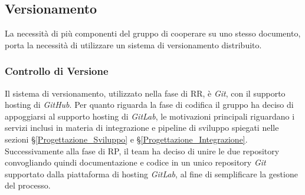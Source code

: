 

\subsection{Versionamento}\label{ProcessiSupporto_Versionamento}
La necessità di più componenti del gruppo di cooperare su uno stesso documento, porta la necessità di utilizzare un sistema di versionamento distribuito. 



\subsubsection{Controllo di Versione}\label{ControlloVersione}
Il sistema di versionamento, utilizzato nella fase di RR, è \textit{Git}, con il supporto hosting di \textit{GitHub}. Per quanto riguarda la fase di codifica il gruppo ha deciso di appoggiarsi al supporto hosting di \textit{GitLab}, le motivazioni principali riguardano i servizi inclusi in materia di integrazione e pipeline di sviluppo spiegati nelle sezioni §\ref{Progettazione_Sviluppo} e §\ref{Progettazione_Integrazione}.\\
Successivamente alla fase di RP, il team ha deciso di unire le due repository convogliando quindi documentazione e codice in un unico repository \textit{Git} supportato dalla piattaforma di hosting \textit{GitLab}, al fine di semplificare la gestione del processo.

